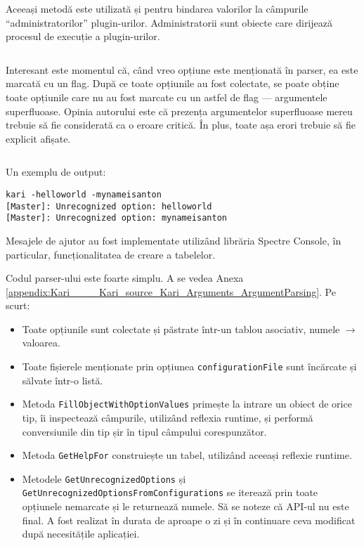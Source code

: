 \documentclass[a4paper,12pt]{report}
\begin{document}
Aceeași metodă este utilizată și pentru bindarea valorilor la câmpurile ``administratorilor'' plugin-urilor.
Administratorii sunt obiecte care dirijează procesul de execuție a plugin-urilor.
\inputminted[firstline=208, lastline=221]{cs}{../Kari/source/Kari.GeneratorCore/Workflow/MasterEnvironment.cs}


Interesant este momentul că, când vreo opțiune este menționată în parser, ea este marcată cu un flag.
După ce toate opțiunile au fost colectate, se poate obține toate opțiunile care nu au fost marcate cu un astfel de flag --- argumentele superfluoase.
Opinia autorului este că prezența argumentelor superfluoase mereu trebuie să fie considerată ca o eroare critică.
În plus, toate așa erori trebuie să fie explicit afișate.
\inputminted[firstline=446, lastline=460]{cs}{../Kari/source/Kari.Generator/KariCompiler.cs}

Un exemplu de output:

\begin{verbatim}
kari -helloworld -mynameisanton
[Master]: Unrecognized option: helloworld
[Master]: Unrecognized option: mynameisanton
\end{verbatim}


Mesajele de ajutor au fost implementate utilizând librăria Spectre Console\cite{spectre_console_github}, în particular, funcționalitatea de creare a tabelelor.


Codul parser-ului este foarte simplu.
A se vedea Anexa \ref{appendix:Kari____Kari_source_Kari_Arguments_ArgumentParsing}.
Pe scurt:

\begin{itemize}
  \item Toate opțiunile sunt colectate și păstrate într-un tablou asociativ, numele $\rightarrow$ valoarea.
  \item Toate fișierele menționate prin opțiunea \texttt{configurationFile} sunt încărcate și sălvate într-o listă.
  \item Metoda \texttt{FillObjectWithOptionValues} primește la intrare un obiect de orice tip, îi inspectează câmpurile, utilizând reflexia runtime, și performă conversiunile din tip șir în tipul câmpului corespunzător.
  \item Metoda \texttt{GetHelpFor} construiește un tabel, utilizând aceeași reflexie runtime.
  \item Metodele \texttt{GetUnrecognizedOptions} și \texttt{GetUnrecognizedOptionsFromConfigurations} se iterează prin toate opțiunele nemarcate și le returnează numele.
  Să se noteze că \ac{API}-ul nu este final.
  A fost realizat în durata de aproape o zi și în continuare ceva modificat după necesitățile aplicației.
\end{itemize}
\end{document}
